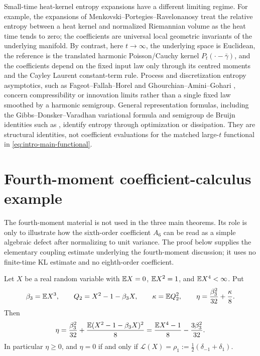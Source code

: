 Small-time heat-kernel entropy expansions have a different limiting regime.
For example, the expansions of
Menkovski--Portegies--Ravelonanosy
\cite{MenkovskiPortegiesRavelonanosy2024HeatKernelEntropy} treat the
relative entropy between a heat kernel and normalized Riemannian volume as the
heat time tends to zero; the coefficients are universal local geometric
invariants of the underlying manifold.  By contrast, here \(t\to\infty\), the
underlying space is Euclidean, the reference is the translated harmonic
Poisson/Cauchy kernel \(P_t(\cdot-\bar\gamma)\), and the coefficients depend
on the fixed input law only through its centred moments and the Cayley Laurent
constant-term rule.  Process and discretization entropy asymptotics, such as
Fageot--Fallah--Horel
\cite{FageotFallahHorel2022EntropicCompressibilityLevy} and
Ghourchian--Amini--Gohari
\cite{GhourchianAminiGohari2018InnovationCompressibility}, concern
compressibility or innovation limits rather than a single fixed law smoothed
by a harmonic semigroup.  General representation formulas, including the
Gibbs--Donsker--Varadhan variational formula
\cite{DonskerVaradhan1975AsymptoticI,DupuisEllis1997WeakConvergence} and
semigroup de Bruijn identities such as
\cite{DeBruijn1953,
Yoshida2017RelativeEntropyDiffusion}, identify entropy through optimization
or dissipation.  They are structural identities, not coefficient evaluations
for the matched large-\(t\) functional in
\eqref{eq:intro-main-functional}.

\section{Fourth-moment coefficient-calculus example}%
\label{app:optional-fourth-moment-coefficient-algebra}
\label{app:fourth-moment-coupling-proof}

The fourth-moment material is not used in the three main theorems.  Its role
is only to illustrate how the sixth-order coefficient \(A_6\) can be read as
a simple algebraic defect after normalizing to unit variance.  The proof
below supplies the elementary coupling estimate underlying the
fourth-moment discussion; it uses no finite-time KL estimate and no
eighth-order coefficient.

\begin{lemma}%
\label{lem:appendix-normalized-fourth-moment-defect-algebra}
Let \(X\) be a real random variable with \(\mathbb{E} X=0\), \(\mathbb{E} X^2=1\), and
\(\mathbb{E} X^4<\infty\).  Put
\[
\beta_3=\mathbb{E} X^3,\qquad
Q_2=X^2-1-\beta_3X,\qquad
\kappa=\mathbb{E} Q_2^2,\qquad
\eta=\frac{\beta_3^2}{32}+\frac{\kappa}{8}.
\]
Then
\begin{equation}\label{eq:appendix-normalized-fourth-moment-algebra}
\eta
=\frac{\beta_3^2}{32}+\frac{\mathbb{E}(X^2-1-\beta_3X)^2}{8}
=\frac{\mathbb{E} X^4-1}{8}-\frac{3\beta_3^2}{32}.
\end{equation}
In particular \(\eta\ge0\), and \(\eta=0\) if and only if
\(\mathcal L(X)=\rho_1:=\frac12(\delta_{-1}+\delta_1)\).
\end{lemma}

